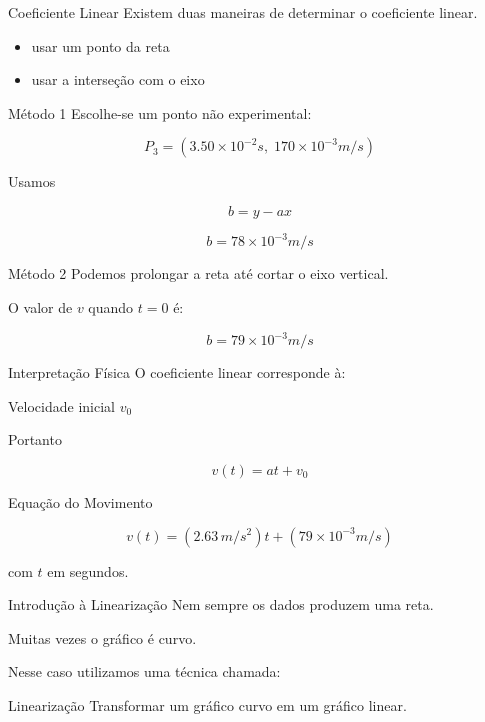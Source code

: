 \documentclass[aspectratio=169]{beamer}
\begin{document}
\begin{frame}{Coeficiente Linear}
Existem duas maneiras de determinar o coeficiente linear.

\begin{itemize}
\item usar um ponto da reta
\item usar a interseção com o eixo
\end{itemize}
\end{frame}


\begin{frame}{Método 1}
Escolhe-se um ponto não experimental:

\[
P_3=(3.50\times10^{-2}s,\;170\times10^{-3}m/s)
\]

Usamos

\[
b=y-ax
\]

\[
b=78\times10^{-3}m/s
\]
\end{frame}


\begin{frame}{Método 2}
Podemos prolongar a reta até cortar o eixo vertical.

O valor de $v$ quando $t=0$ é:

\[
b=79\times10^{-3}m/s
\]
\end{frame}


\begin{frame}{Interpretação Física}
O coeficiente linear corresponde à:

\begin{block}{Velocidade inicial}
$v_0$
\end{block}

Portanto

\[
v(t)=at+v_0
\]
\end{frame}


\begin{frame}{Equação do Movimento}

\[
v(t)= (2.63\,m/s^2)t + (79\times10^{-3}m/s)
\]

com $t$ em segundos.
\end{frame}


\begin{frame}{Introdução à Linearização}
Nem sempre os dados produzem uma reta.

Muitas vezes o gráfico é curvo.

Nesse caso utilizamos uma técnica chamada:

\begin{block}{Linearização}
Transformar um gráfico curvo em um gráfico linear.
\end{block}
\end{frame}
\end{document}
